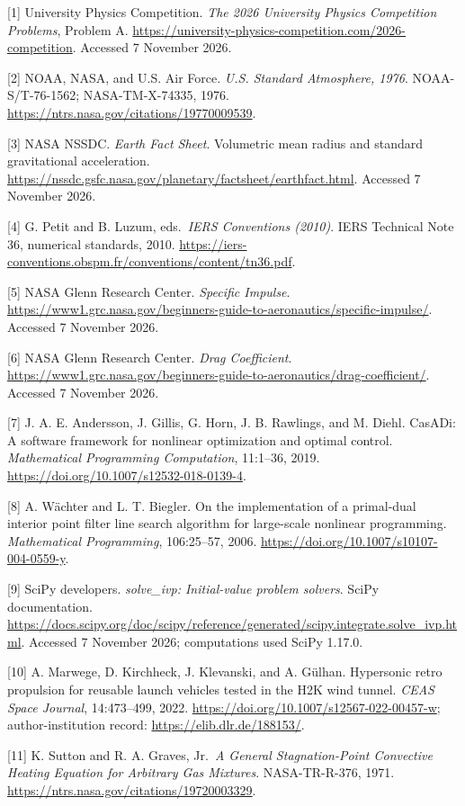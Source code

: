 \documentclass[
  11pt,
  a4paper,
]{article}
\begin{document}
{[}1{]} University Physics Competition. \emph{The 2026 University
Physics Competition Problems}, Problem A.
\url{https://university-physics-competition.com/2026-competition}.
Accessed 7 November 2026.

{[}2{]} NOAA, NASA, and U.S. Air Force. \emph{U.S. Standard Atmosphere,
1976}. NOAA-S/T-76-1562; NASA-TM-X-74335, 1976.
\url{https://ntrs.nasa.gov/citations/19770009539}.

{[}3{]} NASA NSSDC. \emph{Earth Fact Sheet}. Volumetric mean radius and
standard gravitational acceleration.
\url{https://nssdc.gsfc.nasa.gov/planetary/factsheet/earthfact.html}.
Accessed 7 November 2026.

{[}4{]} G. Petit and B. Luzum, eds.~\emph{IERS Conventions (2010)}. IERS
Technical Note 36, numerical standards, 2010.
\url{https://iers-conventions.obspm.fr/conventions/content/tn36.pdf}.

{[}5{]} NASA Glenn Research Center. \emph{Specific Impulse}.
\url{https://www1.grc.nasa.gov/beginners-guide-to-aeronautics/specific-impulse/}.
Accessed 7 November 2026.

{[}6{]} NASA Glenn Research Center. \emph{Drag Coefficient}.
\url{https://www1.grc.nasa.gov/beginners-guide-to-aeronautics/drag-coefficient/}.
Accessed 7 November 2026.

{[}7{]} J. A. E. Andersson, J. Gillis, G. Horn, J. B. Rawlings, and M.
Diehl. CasADi: A software framework for nonlinear optimization and
optimal control. \emph{Mathematical Programming Computation}, 11:1--36,
2019. \url{https://doi.org/10.1007/s12532-018-0139-4}.

{[}8{]} A. Wächter and L. T. Biegler. On the implementation of a
primal-dual interior point filter line search algorithm for large-scale
nonlinear programming. \emph{Mathematical Programming}, 106:25--57,
2006. \url{https://doi.org/10.1007/s10107-004-0559-y}.

{[}9{]} SciPy developers. \emph{solve\_ivp: Initial-value problem
solvers}. SciPy documentation.
\url{https://docs.scipy.org/doc/scipy/reference/generated/scipy.integrate.solve_ivp.html}.
Accessed 7 November 2026; computations used SciPy 1.17.0.

{[}10{]} A. Marwege, D. Kirchheck, J. Klevanski, and A. Gülhan.
Hypersonic retro propulsion for reusable launch vehicles tested in the
H2K wind tunnel. \emph{CEAS Space Journal}, 14:473--499, 2022.
\url{https://doi.org/10.1007/s12567-022-00457-w}; author-institution
record: \url{https://elib.dlr.de/188153/}.

{[}11{]} K. Sutton and R. A. Graves, Jr.~\emph{A General
Stagnation-Point Convective Heating Equation for Arbitrary Gas
Mixtures}. NASA-TR-R-376, 1971.
\url{https://ntrs.nasa.gov/citations/19720003329}.
\end{document}
